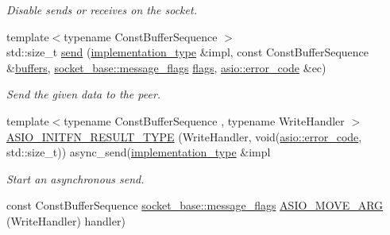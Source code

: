 \begin{DoxyCompactItemize}
\begin{DoxyCompactList}\small\item\em Disable sends or receives on the socket. \end{DoxyCompactList}\item 
{\footnotesize template$<$typename Const\+Buffer\+Sequence $>$ }\\std\+::size\+\_\+t \hyperlink{classasio_1_1seq__packet__socket__service_a8b91d0942f6b3a4272432a6bf9494b75}{send} (\hyperlink{classasio_1_1seq__packet__socket__service_a6e1d2027450d7a5d8ea7896a3de0c8ff}{implementation\+\_\+type} \&impl, const Const\+Buffer\+Sequence \&\hyperlink{classasio_1_1seq__packet__socket__service_ab6c8a16f80485fbb3cdf144b335bb9ee}{buffers}, \hyperlink{classasio_1_1socket__base_ac3cf77465dfedfe1979b5415cf32cc94}{socket\+\_\+base\+::message\+\_\+flags} \hyperlink{classasio_1_1seq__packet__socket__service_a51223946b3c10b64f0d7fc0f1ca0227c}{flags}, \hyperlink{classasio_1_1error__code}{asio\+::error\+\_\+code} \&ec)
\begin{DoxyCompactList}\small\item\em Send the given data to the peer. \end{DoxyCompactList}\item 
{\footnotesize template$<$typename Const\+Buffer\+Sequence , typename Write\+Handler $>$ }\\\hyperlink{classasio_1_1seq__packet__socket__service_a89053257bd6a2de08b6e22a79b16adaf}{A\+S\+I\+O\+\_\+\+I\+N\+I\+T\+F\+N\+\_\+\+R\+E\+S\+U\+L\+T\+\_\+\+T\+Y\+P\+E} (Write\+Handler, void(\hyperlink{classasio_1_1error__code}{asio\+::error\+\_\+code}, std\+::size\+\_\+t)) async\+\_\+send(\hyperlink{classasio_1_1seq__packet__socket__service_a6e1d2027450d7a5d8ea7896a3de0c8ff}{implementation\+\_\+type} \&impl
\begin{DoxyCompactList}\small\item\em Start an asynchronous send. \end{DoxyCompactList}\item 
const Const\+Buffer\+Sequence \hyperlink{classasio_1_1socket__base_ac3cf77465dfedfe1979b5415cf32cc94}{socket\+\_\+base\+::message\+\_\+flags} \hyperlink{classasio_1_1seq__packet__socket__service_a6cfd41ee9245e83d7cfa6d34160db681}{A\+S\+I\+O\+\_\+\+M\+O\+V\+E\+\_\+\+A\+R\+G} (Write\+Handler) handler)
\item 

\end{DoxyCompactItemize}
